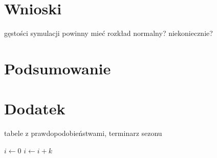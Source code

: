 \documentclass[inzynierska]{pwr_wmat_praca_dyplomowa}
\theoremstyle{plain}
\numberwithin{theorem}{chapter}
\theoremstyle{definition}
\numberwithin{theorem}{chapter}
\begin{document}
\chapter{Wnioski}
gęstości symulacji powinny mieć rozkład normalny? niekoniecznie?

{\backmatter \chapter{Podsumowanie}}

{\backmatter \chapter{Dodatek}}
tabele z prawdopodobieństwami, terminarz sezonu

\newpage

\begin{algorithmic}
	\State $i\gets 0$
	\Else
	\State $i\gets i+k$
	\EndIf
	\EndIf
\end{algorithmic}
\end{document}
